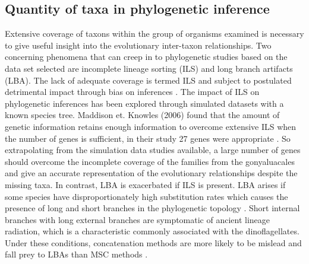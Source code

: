 \documentclass[12pt]{article}
\begin{document}
\subsection*{Quantity of taxa in phylogenetic inference}
Extensive coverage of taxons within the group of organisms examined is necessary to give useful insight into the evolutionary inter-taxon relationships.
Two concerning phenomena that can creep in to phylogenetic studies based on the data set selected are incomplete lineage sorting (ILS) and long branch artifacts (LBA). 
The lack of adequate coverage is termed ILS and subject to postulated detrimental impact through bias on inferences \cite{heath2008taxon}. 
The impact of ILS on phylogenetic inferences has been explored through simulated datasets with a known species tree. 
Maddison et. Knowles (2006) found that the amount of genetic information retains enough information to overcome extensive ILS when the number of genes is sufficient, in their study 27 genes were appropriate \cite{maddison2006inferring}. 
So extrapolating from the simulation data studies available, a large number of genes should overcome the incomplete coverage of the families from the gonyaluacales and give an accurate representation of the evolutionary relationships despite the missing taxa. 
In contrast, LBA is exacerbated if ILS is present. 
LBA arises if some species have disproportionately high substitution rates which causes the presence of long and short branches in the phylogenetic topology \cite{liu2014coalescent}. 
Short internal branches with long external branches are symptomatic of ancient lineage radiation, which is a characteristic commonly associated with the dinoflagellates. 
Under these conditions, concatenation methods are more likely to be mislead and fall prey to LBAs than MSC methods \cite{liu2014coalescent}.
\end{document}
